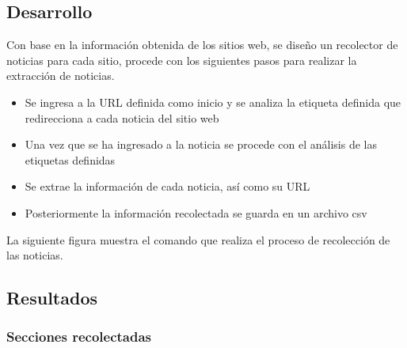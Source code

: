 \subsection{Desarrollo}
Con base en la información obtenida de los sitios web, se diseño un recolector de noticias para cada sitio, procede con 
los siguientes pasos para realizar la extracción de noticias.
\begin{itemize}
  \item Se ingresa a la URL definida como inicio y se analiza la etiqueta definida que redirecciona a cada noticia del sitio web
  \item Una vez que se ha ingresado a la noticia se procede con el análisis de las etiquetas definidas
  \item Se extrae la información de cada noticia, así como su URL
  \item Posteriormente la información recolectada se guarda en un archivo csv
\end{itemize}
La siguiente figura muestra el comando que realiza el proceso de recolección de las noticias.


\subsection{Resultados}

\subsubsection{Secciones recolectadas}


